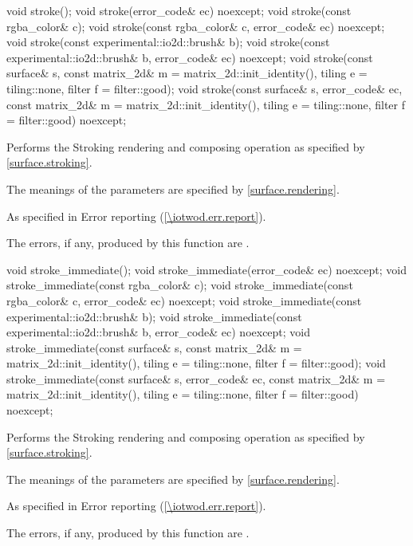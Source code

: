 \begin{itemdecl}
void stroke();
void stroke(error_code& ec) noexcept;
void stroke(const rgba_color& c);
void stroke(const rgba_color& c, error_code& ec) noexcept;
void stroke(const experimental::io2d::brush& b);
void stroke(const experimental::io2d::brush& b, error_code& ec) noexcept;
void stroke(const surface& s,
  const matrix_2d& m = matrix_2d::init_identity(), tiling e = tiling::none,
  filter f = filter::good);
void stroke(const surface& s, error_code& ec, 
  const matrix_2d& m = matrix_2d::init_identity(), tiling e = tiling::none,
  filter f = filter::good) noexcept;
\end{itemdecl}
\begin{itemdescr}
\pnum
\effects
Performs the Stroking rendering and composing operation as specified by \ref{surface.stroking}.

\pnum
The meanings of the parameters are specified by \ref{surface.rendering}.

\pnum
\throws
As specified in Error reporting (\ref{\iotwod.err.report}).

\pnum
\errors
The errors, if any, produced by this function are .
\end{itemdescr}

\begin{itemdecl}
void stroke_immediate();
void stroke_immediate(error_code& ec) noexcept;
void stroke_immediate(const rgba_color& c);
void stroke_immediate(const rgba_color& c, error_code& ec) noexcept;
void stroke_immediate(const experimental::io2d::brush& b);
void stroke_immediate(const experimental::io2d::brush& b, error_code& ec)
  noexcept;
void stroke_immediate(const surface& s,
  const matrix_2d& m = matrix_2d::init_identity(), tiling e = tiling::none, 
  filter f = filter::good);
void stroke_immediate(const surface& s, error_code& ec, 
  const matrix_2d& m = matrix_2d::init_identity(), tiling e = tiling::none,
  filter f = filter::good) noexcept;
\end{itemdecl}
\begin{itemdescr}
\pnum
\effects
Performs the Stroking rendering and composing operation as specified by \ref{surface.stroking}.

\pnum
The meanings of the parameters are specified by \ref{surface.rendering}.

\pnum
\throws
As specified in Error reporting (\ref{\iotwod.err.report}).

\pnum
\errors
The errors, if any, produced by this function are .
\end{itemdescr}

